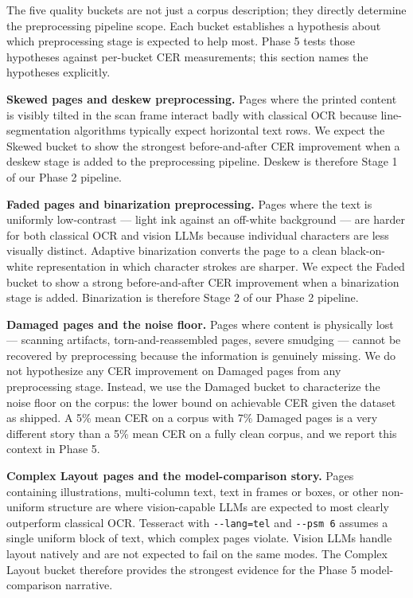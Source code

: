 \documentclass[
  letterpaper,
  DIV=11,
  numbers=noendperiod]{scrartcl}
\begin{document}
The five quality buckets are not just a corpus description; they
directly determine the preprocessing pipeline scope. Each bucket
establishes a hypothesis about which preprocessing stage is expected to
help most. Phase 5 tests those hypotheses against per-bucket CER
measurements; this section names the hypotheses explicitly.

\textbf{Skewed pages and deskew preprocessing.} Pages where the printed
content is visibly tilted in the scan frame interact badly with
classical OCR because line-segmentation algorithms typically expect
horizontal text rows. We expect the Skewed bucket to show the strongest
before-and-after CER improvement when a deskew stage is added to the
preprocessing pipeline. Deskew is therefore Stage 1 of our Phase 2
pipeline.

\textbf{Faded pages and binarization preprocessing.} Pages where the
text is uniformly low-contrast --- light ink against an off-white
background --- are harder for both classical OCR and vision LLMs because
individual characters are less visually distinct. Adaptive binarization
converts the page to a clean black-on-white representation in which
character strokes are sharper. We expect the Faded bucket to show a
strong before-and-after CER improvement when a binarization stage is
added. Binarization is therefore Stage 2 of our Phase 2 pipeline.

\textbf{Damaged pages and the noise floor.} Pages where content is
physically lost --- scanning artifacts, torn-and-reassembled pages,
severe smudging --- cannot be recovered by preprocessing because the
information is genuinely missing. We do not hypothesize any CER
improvement on Damaged pages from any preprocessing stage. Instead, we
use the Damaged bucket to characterize the noise floor on the corpus:
the lower bound on achievable CER given the dataset as shipped. A 5\%
mean CER on a corpus with 7\% Damaged pages is a very different story
than a 5\% mean CER on a fully clean corpus, and we report this context
in Phase 5.

\textbf{Complex Layout pages and the model-comparison story.} Pages
containing illustrations, multi-column text, text in frames or boxes, or
other non-uniform structure are where vision-capable LLMs are expected
to most clearly outperform classical OCR. Tesseract with
\texttt{-\/-lang=tel} and \texttt{-\/-psm\ 6} assumes a single uniform
block of text, which complex pages violate. Vision LLMs handle layout
natively and are not expected to fail on the same modes. The Complex
Layout bucket therefore provides the strongest evidence for the Phase 5
model-comparison narrative.
\end{document}
